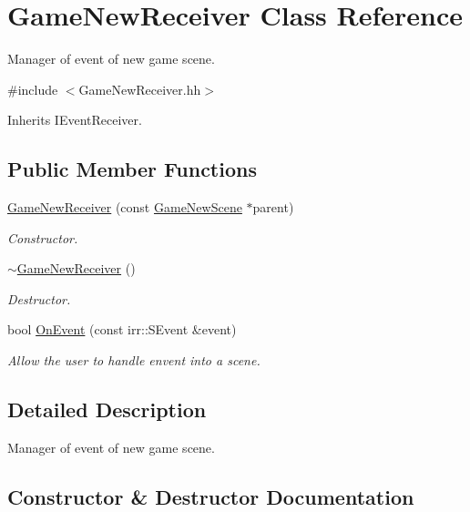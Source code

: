 \hypertarget{classGameNewReceiver}{}\section{Game\+New\+Receiver Class Reference}
\label{classGameNewReceiver}


Manager of event of new game scene.  




{\ttfamily \#include $<$Game\+New\+Receiver.\+hh$>$}



Inherits I\+Event\+Receiver.

\subsection*{Public Member Functions}
\begin{DoxyCompactItemize}
\item 
\hyperlink{classGameNewReceiver_a41816905e385ac8e17849d599106b930}{Game\+New\+Receiver} (const \hyperlink{classGameNewScene}{Game\+New\+Scene} $\ast$parent)
\begin{DoxyCompactList}\small\item\em Constructor. \end{DoxyCompactList}\item 
\hyperlink{classGameNewReceiver_ab92b6653b56d291853a4e2f737eaf6fd}{$\sim$\+Game\+New\+Receiver} ()
\begin{DoxyCompactList}\small\item\em Destructor. \end{DoxyCompactList}\item 
bool \hyperlink{classGameNewReceiver_ad9ec097d8b46946ed1a21c24463fc0b6}{On\+Event} (const irr\+::\+S\+Event \&event)
\begin{DoxyCompactList}\small\item\em Allow the user to handle envent into a scene. \end{DoxyCompactList}\end{DoxyCompactItemize}


\subsection{Detailed Description}
Manager of event of new game scene. 

\subsection{Constructor \& Destructor Documentation}
\mbox{\label{classGameNewReceiver_a41816905e385ac8e17849d599106b930}} 
